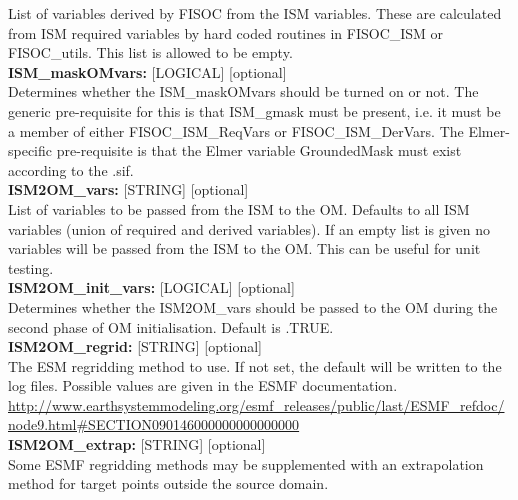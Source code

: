 \documentclass[11pt]{article}
\begin{document}
\begin{flushleft}
List of variables derived by FISOC from the ISM variables. These are 
calculated from ISM required variables by hard coded routines in 
FISOC\_ISM or FISOC\_utils. This list is allowed to be empty.              \\
\vspace{6pt}
\textbf{ISM\_maskOMvars:} [LOGICAL] [optional]                             \\
Determines whether the ISM\_maskOMvars should be turned on or not. The generic
pre-requisite for this is that ISM\_gmask must be present, i.e. it must be a 
member of either FISOC\_ISM\_ReqVars or FISOC\_ISM\_DerVars.
The Elmer-specific pre-requisite is that the Elmer variable GroundedMask must
exist according to the .sif.                                               \\
\vspace{6pt}
\textbf{ISM2OM\_vars:}        [STRING] [optional]                          \\
List of variables to be passed from the ISM to the OM. Defaults to 
all ISM variables (union of required and derived variables). If an empty 
list is given no variables will be passed from the ISM to the OM.  This 
can be useful for unit testing.                                            \\ 
\vspace{6pt}
\textbf{ISM2OM\_init\_vars:}  [LOGICAL] [optional]                         \\
Determines whether the ISM2OM\_vars should be passed to the OM during the 
second phase of OM initialisation.   Default is .TRUE.                     \\ 
\vspace{6pt}
\textbf{ISM2OM\_regrid:}       [STRING] [optional]                         \\
The ESM regridding method to use.  If not set, the default will be 
written to the log files.  Possible values are given in the ESMF 
documentation. 
\url{http://www.earthsystemmodeling.org/esmf_releases/public/last/ESMF_refdoc/node9.html#SECTION090146000000000000000} \\
\vspace{6pt}
\textbf{ISM2OM\_extrap:}       [STRING] [optional]                         \\
Some ESMF regridding methods may be supplemented with an extrapolation
method for target points outside the source domain.
\vspace{6pt}


\end{flushleft}
\end{document}
